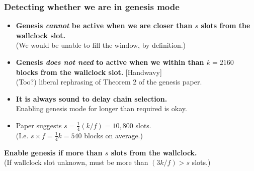 \documentclass[t]{beamer}
\begin{document}
\begin{frame}

\frametitle{Detecting whether we are in genesis mode}

\begin{itemize}
\item \textbf{Genesis \emph{cannot} be active when we are closer than $s$ \alert{slots} from the
wallclock slot.}
\\ (We would be unable to fill the window, by definition.)
\item \textbf{Genesis \emph{does not need} to active when we within than $k = 2160$ \alert{blocks} from
the wallclock slot.} [Handwavy] \\
(Too?) liberal rephrasing of Theorem 2 of the genesis paper.
\item \textbf{It is always sound to delay chain selection.} \\
Enabling genesis mode for longer than required is okay.
\item Paper suggests $s = \frac{1}{4} (k/f) = 10,800$ slots. \\
(I.e. $s \times f = \frac{1}{4}k = 540$ blocks on average.)
\end{itemize}

\begin{alertblock}{}
\textbf{Enable genesis if more than $s$ slots from the wallclock.} \\
(If wallclock slot unknown,  must be more than $(3k/f) > s$ slots.)
\end{alertblock}

\end{frame}


\end{document}
